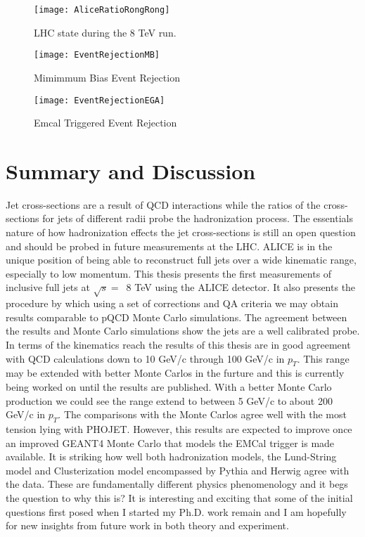 \begin{figure}[h]
\texttt{[image: AliceRatioRongRong]}
\centering
\caption{LHC state during the 8 TeV run. }
\label{fig:RunEff}
\end{figure}

\begin{figure}[!tbp]
  \centering
  \begin{minipage}[b]{0.4\textwidth}
    \texttt{[image: EventRejectionMB]}
    \caption{Mimimmum Bias Event Rejection}
  \end{minipage}
  \hfill
  \begin{minipage}[b]{0.49\textwidth}
    \texttt{[image: EventRejectionEGA]}
    \caption{Emcal Triggered Event Rejection}
  \end{minipage}
\end{figure}

\section{Summary and Discussion}

Jet cross-sections are a result of QCD interactions while the ratios of the cross-sections for jets of different radii probe the hadronization process.  The essentials nature of how hadronization effects the jet cross-sections is still an open question and should be probed in future measurements at the LHC.  ALICE is in the unique position of being able to reconstruct full jets over a wide kinematic range, especially to low momentum.  
This thesis presents the first measurements of inclusive full jets at $\sqrt{s} = \,$ 8 TeV using the ALICE detector.  It also presents the procedure by which using a set of corrections and QA criteria we may obtain results comparable to pQCD Monte Carlo simulations.  The agreement between the results and Monte Carlo simulations show the jets are a well calibrated probe.  In terms of the kinematics reach the results of this thesis are in good agreement with QCD calculations down to 10 GeV/c through 100 GeV/c in $p_{T}$.  This range may be extended with better Monte Carlos in the furture and this is currently being worked on until the results are published.  With a better Monte Carlo production we could see the range extend to between 5 GeV/c to about 200 GeV/c in $p_{T}$.  The comparisons with the Monte Carlos agree well with the most tension lying with PHOJET.  However, this results are expected to improve once an improved GEANT4 Monte Carlo that models the EMCal trigger is made available.  It is striking how well both hadronization models, the Lund-String model and Clusterization model encompassed by Pythia and Herwig agree with the data.  These are fundamentally different physics phenomenology and it begs the question to why this is?   It is interesting and exciting that some of the initial questions first posed when I started my Ph.D. work remain and I am hopefully for new insights from future work in both theory and experiment.  

